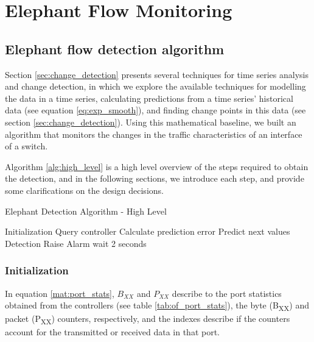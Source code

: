 \chapter{Elephant Flow Monitoring} \label{chap:me} 

\section{Elephant flow detection algorithm}

\par Section \ref{sec:change_detection} presents several techniques for time series analysis and change detection, in which we explore the available 
techniques for modelling the data in a time series, calculating predictions from a time series' historical data (see equation \ref{eq:exp_smooth}), and 
finding change points in this data (see section \ref{sec:change_detection}). Using this mathematical baseline, we built an algorithm that monitors the changes
in the traffic characteristics of an interface of a switch. 

\par Algorithm \ref{alg:high_level} is a high level overview of the steps required to obtain the detection,
and in the following sections, we introduce each step, and provide some clarifications on the design decisions.

\begin{algorithm}[H]
    \caption{Elephant Detection Algorithm - High Level} \label{alg:high_level}
    \begin{algorithmic}[1]
            \State Initialization
            \State Query controller
            \Loop
                \State Calculate prediction error
                \State Predict next values
                \State Detection
                    \State Raise Alarm
                \EndIf
                \State wait 2 seconds
            \EndLoop
        \EndProcedure 
       \end{algorithmic}
\end{algorithm}

\subsection{Initialization}

\par In equation \ref{mat:port_stats}, $B_{XX}$ and $P_{XX}$ describe to the port statistics obtained from the controllers (see table \ref{tab:of_port_stats}), the 
byte (B\textsubscript{XX}) and packet (P\textsubscript{XX}) counters, respectively, and the indexes describe if the counters account for the transmitted or
received data in that port.

